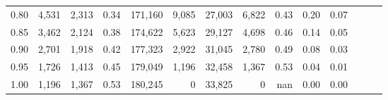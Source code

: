 \begin{tabular}{rrrrrrrrrrrrrr}
0.80 &   4,531 &  2,313 &  0.34 &  171,160 &    9,085 &  27,003 &   6,822 &  0.43 &  0.20 &      0.07 \\
0.85 &   3,462 &  2,124 &  0.38 &  174,622 &    5,623 &  29,127 &   4,698 &  0.46 &  0.14 &      0.05 \\
0.90 &   2,701 &  1,918 &  0.42 &  177,323 &    2,922 &  31,045 &   2,780 &  0.49 &  0.08 &      0.03 \\
0.95 &   1,726 &  1,413 &  0.45 &  179,049 &    1,196 &  32,458 &   1,367 &  0.53 &  0.04 &      0.01 \\
1.00 &   1,196 &  1,367 &  0.53 &  180,245 &        0 &  33,825 &       0 &   nan &  0.00 &      0.00 \\
\bottomrule
\end{tabular}
